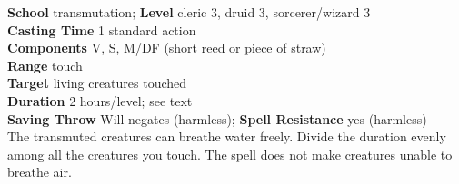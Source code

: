 \textbf{School} transmutation; \textbf{Level} cleric 3, druid 3, sorcerer/wizard 3\\
\textbf{Casting Time} 1 standard action\\
\textbf{Components} V, S, M/DF (short reed or piece of straw)\\
\textbf{Range} touch\\
\textbf{Target} living creatures touched\\
\textbf{Duration} 2 hours/level; see text\\
\textbf{Saving Throw }Will negates (harmless); \textbf{Spell Resistance} yes (harmless)\\
The transmuted creatures can breathe water freely. Divide the duration evenly among all the creatures you touch. The spell does not make creatures unable to breathe air.\\

